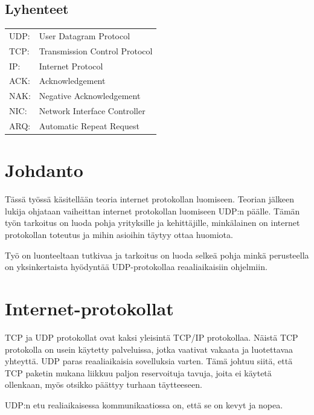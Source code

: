 \documentclass[a4paper,12pt]{article}
\begin{document}
\begin{titlepage}
        \tableofcontents
        \newpage
        \thispagestyle{empty}


        \section*{Lyhenteet}
        \begin{tabular}{l l}
            UDP: & User Datagram Protocol        \\
            TCP: & Transmission Control Protocol \\
            IP:  & Internet Protocol             \\
            ACK: & Acknowledgement               \\
            NAK: & Negative Acknowledgement      \\
            NIC: & Network Interface Controller  \\
            ARQ: & Automatic Repeat Request      \\
        \end{tabular}
        \newpage


    \end{titlepage}


    \section{Johdanto}\label{sec:johdanto}
    Tässä työssä käsitellään teoria internet protokollan luomiseen. Teorian jälkeen lukija ohjataan vaiheittan internet protokollan luomiseen UDP:n päälle. Tämän työn tarkoitus on luoda pohja yrityksille ja kehittäjille, minkälainen on internet protokollan toteutus ja mihin asioihin täytyy ottaa huomiota.
    \par Työ on luonteeltaan tutkivaa ja tarkoitus on luoda selkeä pohja minkä perusteella on yksinkertaista hyödyntää UDP-protokollaa reaaliaikaisiin ohjelmiin.


    \section{Internet-protokollat}
    TCP ja UDP protokollat ovat kaksi yleisintä TCP/IP protokollaa.
    Näistä TCP protokolla on usein käytetty palveluissa, jotka vaativat vakaata ja luotettavaa yhteyttä. UDP paras reaaliaikaisia sovelluksia varten. Tämä johtuu siitä, että TCP paketin mukana liikkuu paljon reservoituja tavuja, joita ei käytetä ollenkaan, myös otsikko päättyy turhaan täytteeseen.
    \par
    UDP:n etu realiaikaisessa kommunikaatiossa on, että se on kevyt ja nopea.
    \cite{KumarSurveyUDP}
    \par
\end{document}
